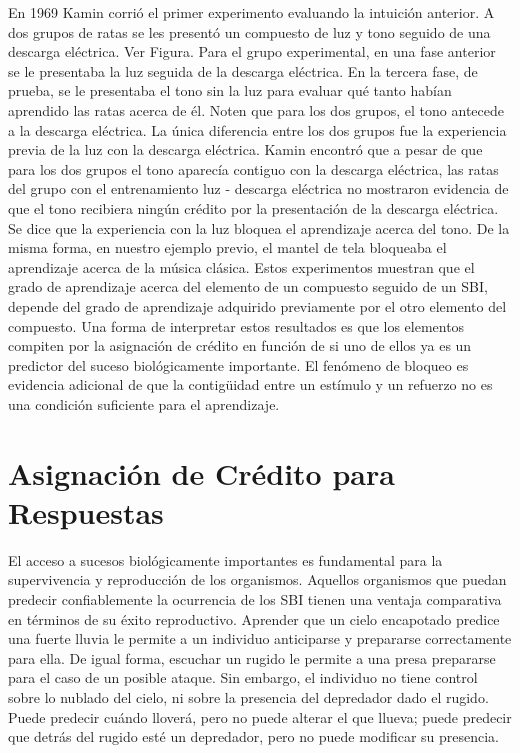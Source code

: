 \documentclass[
  a4paper,
  DIV=11,
  numbers=noendperiod]{scrreprt}
\begin{document}
En 1969 Kamin corrió el primer experimento evaluando la intuición
anterior. A dos grupos de ratas se les presentó un compuesto de luz y
tono seguido de una descarga eléctrica. Ver Figura. Para el grupo
experimental, en una fase anterior se le presentaba la luz seguida de la
descarga eléctrica. En la tercera fase, de prueba, se le presentaba el
tono sin la luz para evaluar qué tanto habían aprendido las ratas acerca
de él. Noten que para los dos grupos, el tono antecede a la descarga
eléctrica. La única diferencia entre los dos grupos fue la experiencia
previa de la luz con la descarga eléctrica. Kamin encontró que a pesar
de que para los dos grupos el tono aparecía contiguo con la descarga
eléctrica, las ratas del grupo con el entrenamiento luz - descarga
eléctrica no mostraron evidencia de que el tono recibiera ningún crédito
por la presentación de la descarga eléctrica. Se dice que la experiencia
con la luz bloquea el aprendizaje acerca del tono. De la misma forma, en
nuestro ejemplo previo, el mantel de tela bloqueaba el aprendizaje
acerca de la música clásica. Estos experimentos muestran que el grado de
aprendizaje acerca del elemento de un compuesto seguido de un SBI,
depende del grado de aprendizaje adquirido previamente por el otro
elemento del compuesto. Una forma de interpretar estos resultados es que
los elementos compiten por la asignación de crédito en función de si uno
de ellos ya es un predictor del suceso biológicamente importante. El
fenómeno de bloqueo es evidencia adicional de que la contigüidad entre
un estímulo y un refuerzo no es una condición suficiente para el
aprendizaje.


\chapter{Asignación de Crédito para
Respuestas}\label{asignaciuxf3n-de-cruxe9dito-para-respuestas}

El acceso a sucesos biológicamente importantes es fundamental para la
supervivencia y reproducción de los organismos. Aquellos organismos que
puedan predecir confiablemente la ocurrencia de los SBI tienen una
ventaja comparativa en términos de su éxito reproductivo. Aprender que
un cielo encapotado predice una fuerte lluvia le permite a un individuo
anticiparse y prepararse correctamente para ella. De igual forma,
escuchar un rugido le permite a una presa prepararse para el caso de un
posible ataque. Sin embargo, el individuo no tiene control sobre lo
nublado del cielo, ni sobre la presencia del depredador dado el rugido.
Puede predecir cuándo lloverá, pero no puede alterar el que llueva;
puede predecir que detrás del rugido esté un depredador, pero no puede
modificar su presencia.
\end{document}
